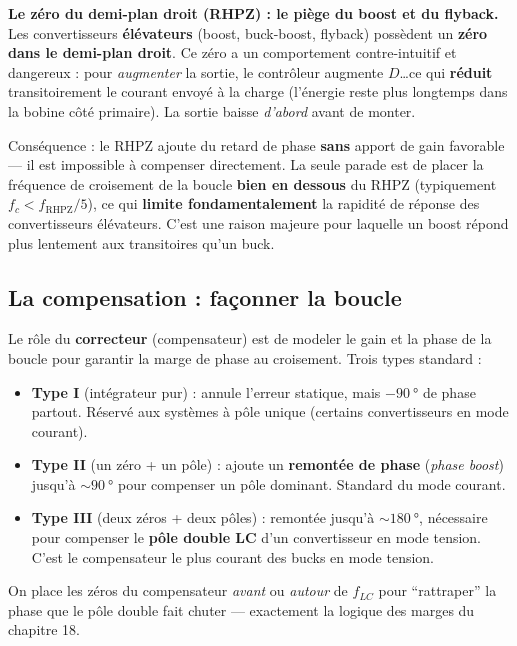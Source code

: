\documentclass[12pt,a4paper,twoside]{book}
\begin{document}
\begin{attention}
\textbf{Le zéro du demi-plan droit (RHPZ) : le piège du boost et du flyback.} Les convertisseurs \textbf{élévateurs} (boost, buck-boost, flyback) possèdent un \textbf{zéro dans le demi-plan droit}. Ce zéro a un comportement contre-intuitif et dangereux : pour \textit{augmenter} la sortie, le contrôleur augmente $D$\ldots ce qui \textbf{réduit} transitoirement le courant envoyé à la charge (l'énergie reste plus longtemps dans la bobine côté primaire). La sortie baisse \textit{d'abord} avant de monter.

Conséquence : le RHPZ ajoute du retard de phase \textbf{sans} apport de gain favorable --- il est impossible à compenser directement. La seule parade est de placer la fréquence de croisement de la boucle \textbf{bien en dessous} du RHPZ (typiquement $f_c < f_{\text{RHPZ}}/5$), ce qui \textbf{limite fondamentalement} la rapidité de réponse des convertisseurs élévateurs. C'est une raison majeure pour laquelle un boost répond plus lentement aux transitoires qu'un buck.
\end{attention}

\subsection{La compensation : façonner la boucle}

\begin{formule}
Le rôle du \textbf{correcteur} (compensateur) est de modeler le gain et la phase de la boucle pour garantir la marge de phase au croisement. Trois types standard :
\begin{itemize}[nosep]
\item \textbf{Type I} (intégrateur pur) : annule l'erreur statique, mais $-\SI{90}{°}$ de phase partout. Réservé aux systèmes à pôle unique (certains convertisseurs en mode courant).
\item \textbf{Type II} (un zéro + un pôle) : ajoute un \textbf{remontée de phase} (\textit{phase boost}) jusqu'à $\sim\SI{90}{°}$ pour compenser un pôle dominant. Standard du mode courant.
\item \textbf{Type III} (deux zéros + deux pôles) : remontée jusqu'à $\sim\SI{180}{°}$, nécessaire pour compenser le \textbf{pôle double LC} d'un convertisseur en mode tension. C'est le compensateur le plus courant des bucks en mode tension.
\end{itemize}
On place les zéros du compensateur \textit{avant} ou \textit{autour} de $f_{LC}$ pour ``rattraper'' la phase que le pôle double fait chuter --- exactement la logique des marges du chapitre 18.
\end{formule}
\end{document}
